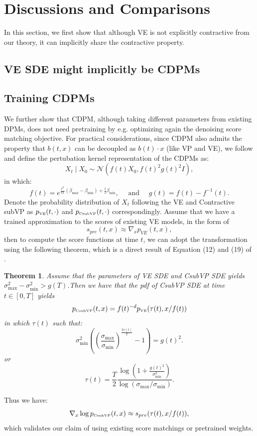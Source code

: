 \documentclass[letterpaper,11pt,reqno]{amsart}
\newtheorem{theorem}{Theorem}[section]
\numberwithin{equation}{section}
\begin{document}
\section{Discussions and Comparisons}
In this section, we first show that although VE is not explicitly contractive from our theory, it can implicitly share the contractive property.

\subsection{VE SDE might implicitly be CDPMs}


\subsection{Training CDPMs}
We further show that CDPM, although taking different parameters from existing DPMs, does not need pretraining by e.g. optimizing again the denoising score matching objective. For practical considerations, since CDPM also admits the property that $b(t,x)$ can be decoupled as $b(t)\cdot x$ (like VP and VE), we follow \cite{karras2022elucidating} and define the pertubation kernel representation of the CDPMs as:
$$
X_t \mid X_0\sim \mathcal{N}\left(f(t) X_0, f(t)^2 g(t)^2 I\right),
$$
in which:
$$
f(t)=e^{\frac{t^2}{4T}(\beta_{\max} - \beta_{\min}) + \frac{t}{2} \beta_{\min}}, \quad \text { and } \quad g(t)=f(t)-f^{-1}(t).
$$
Denote the probability distribution of $X_t$ following the VE and Contractive subVP as $p_{\tiny \mbox{VE}}(t,\cdot)$ and $p_{\tiny \mbox{CsubVP}}(t,\cdot)$ correspondingly. Assume that we have a trained approximation to the scores of existing VE models, in the form of 
$$
s_{pre}(t,x)\approx \nabla_x p_{VE}(t,x),
$$
then to compute the score functions at time $t$, we can adopt the transformation using the following theorem, which is a direct result of Equation (12) and (19) of \cite{karras2022elucidating}.

\begin{theorem}
Assume that the parameters of VE SDE and CsubVP SDE yields $\sigma^2_{\max}-\sigma^2_{\min}>g(T)$.Then we have that the pdf of CsubVP SDE at time $t\in [0,T]$ yields
\begin{equation}
p_{\tiny \mbox{CsubVP}}(t,x) = f(t)^{-d} p_{\tiny \mbox{VE}}(\tau(t),x/f(t))
\end{equation}
in which $\tau(t)$ such that:
\begin{equation}
\sigma^2_{\min}\left( \left(\frac{\sigma_{\max}}{\sigma_{\min}} \right)^{\frac{2\tau(t)}{T}}- 1 \right) = g(t)^2.
\end{equation}
or
\begin{equation}
\tau(t)=\frac{T}{2}\frac{\log(1+\frac{g(t)^2}{\sigma^2_{\min}})}{\log(\sigma_{\max}/\sigma_{\min})}.
\end{equation}
\end{theorem}
Thus we have: 
$$\nabla_x\log p_{\tiny \mbox{CsubVP}}(t,x)\approx s_{pre}(\tau(t),x/f(t)),$$
which validates our claim of using existing score matchings or pretrained weights.
\end{document}
